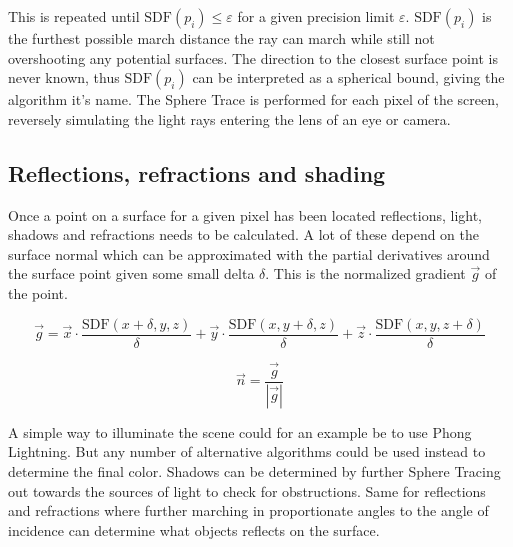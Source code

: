 		This is repeated until $\text{SDF}(p_i) \leq \varepsilon$ for a given
		precision limit $\varepsilon$. $\text{SDF}(p_i)$ is the furthest possible
		march distance the ray can march while still not overshooting any potential
		surfaces. The direction to the closest surface point is never known, thus
		$\text{SDF}(p_i)$ can be interpreted as a spherical bound, giving the
		algorithm it's name. The Sphere Trace is performed for each pixel of the
		screen, reversely simulating the light rays entering the lens of an eye or
		camera.

			\subsection{Reflections, refractions and shading}

				Once a point on a surface for a given pixel has been located
				reflections, light, shadows and refractions needs to be calculated. A
				lot of these depend on the surface normal which can be approximated with
				the partial derivatives around the surface point given some small delta
				$\delta$. This is the normalized gradient $\vec{g}$ of the point.

				$$\vec{g} = \vec{x}\cdot\frac{\text{SDF}(x+\delta, y, z)}{\delta} +
				\vec{y}\cdot\frac{\text{SDF}(x, y+\delta, z)}{\delta} +
				\vec{z}\cdot\frac{\text{SDF}(x, y, z+\delta)}{\delta} $$

				$$\vec{n} = \frac{\vec{g}}{|\vec{g}|} $$

				A simple way to illuminate the scene could for an example be to use
				Phong Lightning\cite{Phong1975}. But any number of alternative
				algorithms could be used instead to determine the final color. Shadows
				can be determined by further Sphere Tracing out towards the sources of
				light to check for obstructions. Same for reflections and refractions
				where further marching in proportionate angles to the angle of
				incidence can determine what objects reflects on the surface.
